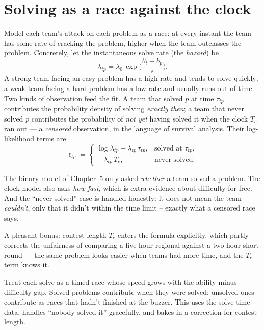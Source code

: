 \documentclass[11pt]{report}
\theoremstyle{definition}
\numberwithin{equation}{chapter}
\begin{document}
\section{Solving as a race against the clock}

Model each team's attack on each problem as a race: at every instant the team has
some rate of cracking the problem, higher when the team outclasses the problem.
Concretely, let the instantaneous solve rate (the \emph{hazard}) be
\begin{equation}\label{eq:hazard}
  \lambda_{tp}=\lambda_0\,\exp\!\Big(\frac{\theta_t-b_p}{s}\Big).
\end{equation}
A strong team facing an easy problem has a high rate and tends to solve quickly; a
weak team facing a hard problem has a low rate and usually runs out of time. Two
kinds of observation feed the fit. A team that solved $p$ at time $\tau_{tp}$
contributes the probability density of solving \emph{exactly then}; a team that
never solved $p$ contributes the probability of \emph{not yet} having solved it
when the clock $T_c$ ran out --- a \emph{censored} observation, in the language of
survival analysis. Their log-likelihood terms are
\begin{equation}\label{eq:surv}
  \ell_{tp}=
  \begin{cases}
    \log\lambda_{tp}-\lambda_{tp}\,\tau_{tp}, & \text{solved at }\tau_{tp},\\[4pt]
    -\,\lambda_{tp}\,T_c, & \text{never solved.}
  \end{cases}
\end{equation}

\begin{intuition}
The binary model of Chapter~5 only asked \emph{whether} a team solved a problem.
The clock model also asks \emph{how fast}, which is extra evidence about
difficulty for free. And the ``never solved'' case is handled honestly: it does
not mean the team \emph{couldn't}, only that it didn't within the time limit --
exactly what a censored race says.
\end{intuition}

A pleasant bonus: contest length $T_c$ enters the formula explicitly, which
partly corrects the unfairness of comparing a five-hour regional against a
two-hour short round --- the same problem looks easier when teams had more time,
and the $T_c$ term knows it.

\begin{takeaway}
Treat each solve as a timed race whose speed grows with the ability-minus-difficulty
gap. Solved problems contribute when they were solved; unsolved ones contribute as
races that hadn't finished at the buzzer. This uses the solve-time data, handles
``nobody solved it'' gracefully, and bakes in a correction for contest length.
\end{takeaway}
\end{document}
